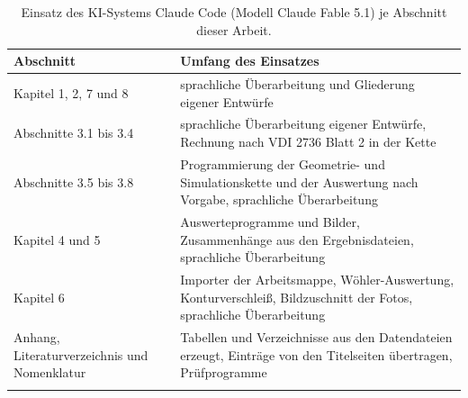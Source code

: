 \begin{table}[htbp]
	\caption{Einsatz des KI-Systems Claude Code (Modell Claude Fable 5.1) je Abschnitt dieser Arbeit.}
	\label{tab:ki_zuordnung}
	\centering
	\footnotesize
	\begin{tabular}{L{4.2cm}L{10.3cm}}
		Abschnitt                                    & Umfang des Einsatzes                                                                                               \\
		\hline
		Kapitel 1, 2, 7 und 8                        & sprachliche Überarbeitung und Gliederung eigener Entwürfe                                                          \\
		\hline
		Abschnitte 3.1 bis 3.4                       & sprachliche Überarbeitung eigener Entwürfe, Rechnung nach VDI 2736 Blatt 2 in der Kette                            \\
		\hline
		Abschnitte 3.5 bis 3.8                       & Programmierung der Geometrie- und Simulationskette und der Auswertung nach Vorgabe, sprachliche Überarbeitung      \\
		\hline
		Kapitel 4 und 5                              & Auswerteprogramme und Bilder, Zusammenhänge aus den Ergebnisdateien,  sprachliche Überarbeitung                    \\
		\hline
		Kapitel 6                                    & Importer der Arbeitsmappe, Wöhler-Auswertung, Konturverschleiß, Bildzuschnitt der Fotos, sprachliche Überarbeitung \\
		\hline
		Anhang, Literaturverzeichnis und Nomenklatur & Tabellen und Verzeichnisse aus den Datendateien erzeugt, Einträge von den Titelseiten übertragen, Prüfprogramme    \\
		\hline
	\end{tabular}
\end{table}
